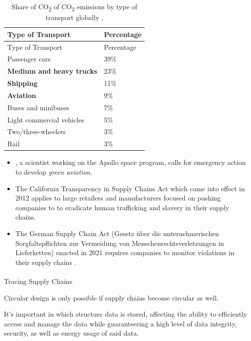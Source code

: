 \documentclass[
  letterpaper,
  DIV=11,
  numbers=noendperiod]{scrartcl}
\makeatletter
\let\oldparagraph\paragraph
\renewcommand{\paragraph}{
    \@ifstar
      \xxxParagraphStar
      \xxxParagraphNoStar
  }
\newcommand{\xxxParagraphStar}[1]{\oldparagraph*{#1}\mbox{}}
\newcommand{\xxxParagraphNoStar}[1]{\oldparagraph{#1}\mbox{}}
\makeatother
\begin{document}
\begin{longtable}[]{@{}ll@{}}
\caption{Share of CO\textsubscript{2} of CO\textsubscript{2} emissions
by type of transport globally
\citep{statistaGlobalTransportCO22022}.}\tabularnewline
\toprule\noalign{}
Type of Transport & Percentage \\
\midrule\noalign{}
\endfirsthead
\toprule\noalign{}
Type of Transport & Percentage \\
\midrule\noalign{}
\endhead
\bottomrule\noalign{}
\endlastfoot
Passenger cars & 39\% \\
\textbf{Medium and heavy trucks} & 23\% \\
\textbf{Shipping} & 11\% \\
\textbf{Aviation} & 9\% \\
Buses and minibuses & 7\% \\
Light commercial vehicles & 5\% \\
Two/three-wheelers & 3\% \\
Rail & 3\% \\
\end{longtable}

\begin{itemize}
\item
  \citet{platzerPerspectiveUrgencyGreen2023}, a scientist working on the
  Apollo space program, calls for emergency action to develop
  \emph{green aviation}.
\item
  The California Transparency in Supply Chains Act which came into
  effect in 2012 applies to large retailers and manufacturers focused on
  pushing companies to to eradicate human trafficking and slavery in
  their supply chains.
\item
  The German Supply Chain Act (Gesetz über die unternehmerischen
  Sorgfaltspflichten zur Vermeidung von Menschenrechtsverletzungen in
  Lieferketten) enacted in 2021 requires companies to monitor violations
  in their supply chains
  \citep{Lieferkettengesetz2023, strettonGermanSupplyChain2022}.
\end{itemize}

\paragraph{Tracing Supply Chains}\label{tracing-supply-chains}

Circular design is only possible if supply chains become circular as
well.

It's important in which structure data is stored, affecting the ability
to efficiently access and manage the data while guaranteering a high
level of data integrity, security, as well as energy usage of said data.
\end{document}
